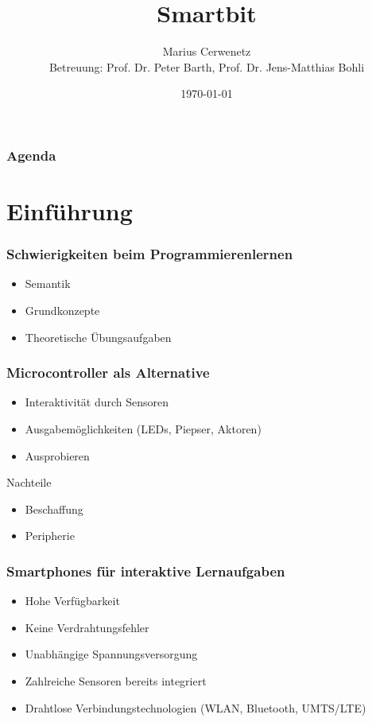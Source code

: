 \documentclass{beamer}
\title{Smartbit}
\author{Marius Cerwenetz\\ \vspace{1cm}
\scriptsize Betreuung:  Prof. Dr. Peter Barth, Prof. Dr. Jens-Matthias Bohli}
\institute{Institut für Softwaretechnik und Datenkommunikation}
\date{\today}
\begin{document}
\frame{\titlepage}

\logo{}

\setcounter{tocdepth}{1}
\begin{frame}
\frametitle{Agenda}
\tableofcontents

\end{frame}

\section{Einführung}

\begin{frame}
    \frametitle{Schwierigkeiten beim Programmierenlernen}
    \begin{itemize}
        \item Semantik
        \item Grundkonzepte
        \item Theoretische Übungsaufgaben
    \end{itemize}
\end{frame}

\begin{frame}
    \frametitle{Microcontroller als Alternative}
    \begin{itemize}
        \item Interaktivität durch Sensoren
        \item Ausgabemöglichkeiten (LEDs, Piepser, Aktoren)
        \item Ausprobieren
    \end{itemize}

    \begin{alertblock}{Nachteile}
        \begin{itemize}
            \item Beschaffung
            \item Peripherie
        \end{itemize}
    \end{alertblock}
\end{frame}



\begin{frame}
    \frametitle{Smartphones für interaktive Lernaufgaben}
    \begin{itemize}
        \item Hohe Verfügbarkeit
        \item Keine Verdrahtungsfehler
        \item Unabhängige Spannungsversorgung
        \item Zahlreiche Sensoren bereits integriert
        \item Drahtlose Verbindungstechnologien (WLAN, Bluetooth, UMTS/LTE)
    \end{itemize}
\end{frame}
\end{document}

